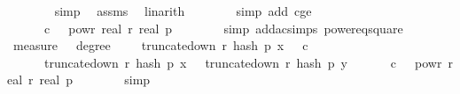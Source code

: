 \begin{isabellebody}
\ \ \ \ \ \ \isamarkupfalse%
\ simp\ \isamarkupfalse%
\ assms{\isacharparenleft}{\kern0pt}{}{\isacharparenright}{\kern0pt}\ \isamarkupfalse%
\ linarith\isanewline
\ \ \ \ \ \ \isamarkupfalse%
\ {\isacharparenleft}{\kern0pt}simp\ add{\isacharcolon}{\kern0pt}\ c{\isacharunderscore}{\kern0pt}ge{\isacharunderscore}{\kern0pt}{}{\isacharparenright}{\kern0pt}{\isacharplus}{\kern0pt}\isanewline
\ \ \ \ \isamarkupfalse%
\ \isamarkupfalse%
\ {\isachardoublequoteopen}{\isachardot}{\kern0pt}{\isachardot}{\kern0pt}{\isachardot}{\kern0pt}\ {\isacharequal}{\kern0pt}\ {}{}\ \ {\isacharasterisk}{\kern0pt}\ c\ {\isacharasterisk}{\kern0pt}\ {}\ powr\ {\isacharparenleft}{\kern0pt}{\isacharminus}{\kern0pt}real\ r{\isacharparenright}{\kern0pt}\ {\isacharslash}{\kern0pt}{\isacharparenleft}{\kern0pt}real\ p{\isacharparenright}{\kern0pt}\isanewline
\ \ \ \ \ \ \isamarkupfalse%
\ {\isacharparenleft}{\kern0pt}simp\ add{\isacharcolon}{\kern0pt}ac{\isacharunderscore}{\kern0pt}simps\ power{}{\isacharunderscore}{\kern0pt}eq{\isacharunderscore}{\kern0pt}square{\isacharparenright}{\kern0pt}\ \isanewline
\ \ \ \ \isamarkupfalse%
\ \isamarkupfalse%
\ {\isachardoublequoteopen}measure\ {\isasymOmega}\ {\isacharbraceleft}{\kern0pt}{\isasymomega}{\isachardot}{\kern0pt}\ degree\ {\isasymomega}\ {\isasymge}\ {}\ {\isasymand}\ truncate{\isacharunderscore}{\kern0pt}down\ r\ {\isacharparenleft}{\kern0pt}hash\ p\ x\ {\isasymomega}{\isacharparenright}{\kern0pt}\ {\isasymle}\ c\ {\isasymand}\isanewline
\ \ \ \ \ \ truncate{\isacharunderscore}{\kern0pt}down\ r\ {\isacharparenleft}{\kern0pt}hash\ p\ x\ {\isasymomega}{\isacharparenright}{\kern0pt}\ {\isacharequal}{\kern0pt}\ truncate{\isacharunderscore}{\kern0pt}down\ r\ {\isacharparenleft}{\kern0pt}hash\ p\ y\ {\isasymomega}{\isacharparenright}{\kern0pt}{\isacharbraceright}{\kern0pt}\ {\isasymle}\ \ {}{}\ \ {\isacharasterisk}{\kern0pt}\ c\ {\isacharasterisk}{\kern0pt}\ {}\ powr\ {\isacharparenleft}{\kern0pt}{\isacharminus}{\kern0pt}real\ r{\isacharparenright}{\kern0pt}\ {\isacharslash}{\kern0pt}{\isacharparenleft}{\kern0pt}real\ p{\isacharparenright}{\kern0pt}\isanewline
\ \ \ \ \ \ \isamarkupfalse%
\ simp\isanewline

\end{isabellebody}
